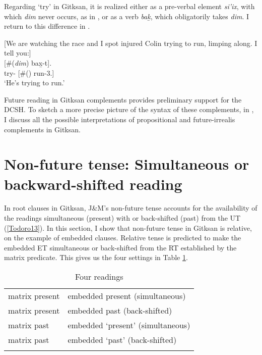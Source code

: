 \documentclass[output=paper]{langscibook}
\begin{document}
Regarding ‘try’ in Gitksan, it is realized either as a pre-verbal element \emph{si’ix}, with which \emph{dim} never occurs, as in , or as a verb \emph{bak̲}, which obligatorily takes \emph{dim}. I return to this difference in . 
	
\begin{exe}
\ex \label{Todoro22} [We are watching the race and I spot injured Colin trying to run, limping along. I tell you:] \\
	[\#(\textit{{dim}}) 	{bax̱-t}].  \\
    {try}- [\#() run-3.{\seriesII}]\\
\glt `He's trying to run.'
\end{exe}

Future reading in Gitksan complements provides preliminary support for the DCSH. To sketch a more precise picture of the syntax of these complements, in , I discuss all the possible interpretations of propositional and future-irrealis complements in Gitksan. 

\section{Non-future tense: Simultaneous or backward-shifted reading}\label{Todoro:sect4}

In root clauses in Gitksan, J\&M’s non-future tense accounts for the availability of the readings simultaneous (present) with or back-shifted (past) from the UT (\ref{Todoro13}). In this section, I show that non-future tense in Gitksan is relative, on the example of embedded clauses. Relative tense is predicted to make the embedded ET simultaneous or back-shifted from the RT established by the matrix predicate. This gives us the four settings in Table \ref{Todorotab1}. 

\begin{table}
\caption{Four readings\label{Todorotab1}}
 \begin{tabular}{ll}
  \lsptoprule
 matrix present &	embedded present (simultaneous) \\
matrix present &	embedded past (back-shifted) \\
matrix past	& embedded ‘present’ (simultaneous)\\
matrix past	& embedded ‘past’ (back-shifted)\\
  \lspbottomrule
 \end{tabular}
 \end{table}
 
\end{document}
